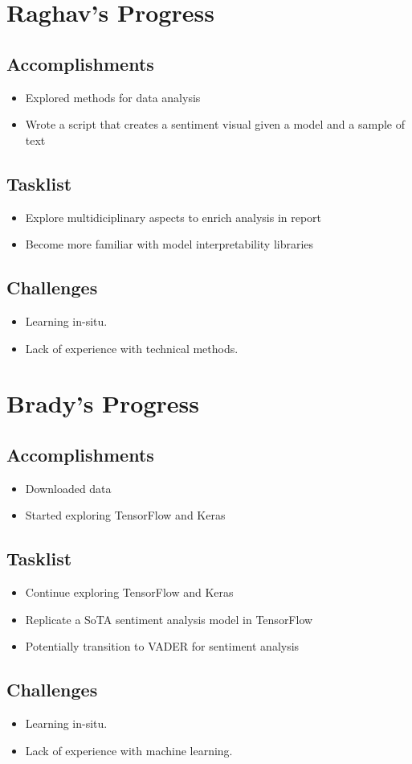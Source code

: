 \documentclass[letterpaper, twoside, draft]{article}
\begin{document}
\section{Raghav's Progress}
\subsection{Accomplishments}
\begin{itemize}
    \item Explored methods for data analysis
    \item Wrote a script that creates a sentiment visual given a model and a sample of text
\end{itemize}
\subsection{Tasklist}
\begin{itemize}
    \item Explore multidiciplinary aspects to enrich analysis in report
    \item Become more familiar with model interpretability libraries
\end{itemize}
\subsection{Challenges}
\begin{itemize}
    \item Learning in-situ.
    \item Lack of experience with technical methods.
\end{itemize}
\section{Brady's Progress}
\subsection{Accomplishments}
\begin{itemize}
    \item Downloaded data
    \item Started exploring TensorFlow and Keras
\end{itemize}
\subsection{Tasklist}
\begin{itemize}
    \item Continue exploring TensorFlow and Keras
    \item Replicate a SoTA sentiment analysis model in TensorFlow
    \item Potentially transition to VADER for sentiment analysis
\end{itemize}
\subsection{Challenges}
\begin{itemize}
    \item Learning in-situ.
    \item Lack of experience with machine learning.
\end{itemize}
\end{document}
